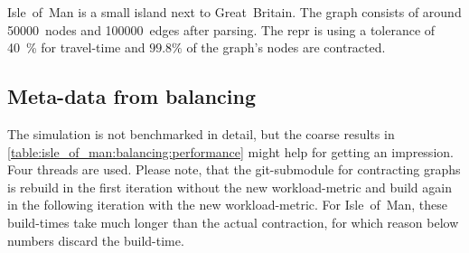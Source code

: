     Isle~of~Man is a small island next to Great~Britain.
    The graph consists of around \num{50000}~nodes and \num{100000}~edges after parsing.
    The \gls{repr} is using a tolerance of \si{40 \percent} for travel-time and $\si{\num{99.8} \percent}$ of the graph's nodes are contracted.

    \subsection{Meta-data from balancing}

        The simulation is not benchmarked in detail, but the coarse results in \vref{table:isle_of_man:balancing:performance} might help for getting an impression.
        Four threads are used.
        Please note, that the git-submodule for contracting graphs is rebuild in the first iteration without the new workload-\gls{metric} and build again in the following iteration with the new workload-\gls{metric}.
        For Isle~of~Man, these build-times take much longer than the actual contraction, for which reason below numbers discard the build-time.
